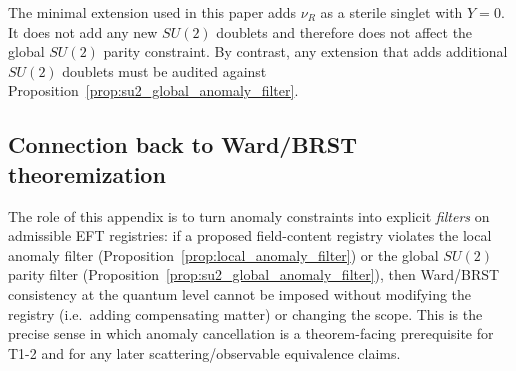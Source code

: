 \begin{remark}\label{rem:witten_filter_nur}
\AuditTag The minimal extension used in this paper adds $\nu_R$ as a sterile singlet with $Y=0$.
It does not add any new $SU(2)$ doublets and therefore does not affect the global $SU(2)$ parity constraint.
By contrast, any extension that adds additional $SU(2)$ doublets must be audited against Proposition~\ref{prop:su2_global_anomaly_filter}.
\end{remark}

\subsection{Connection back to Ward/BRST theoremization}

\AuditTag The role of this appendix is to turn anomaly constraints into explicit \emph{filters} on admissible EFT registries:
if a proposed field-content registry violates the local anomaly filter (Proposition~\ref{prop:local_anomaly_filter}) or the global $SU(2)$ parity filter (Proposition~\ref{prop:su2_global_anomaly_filter}), then Ward/BRST consistency at the quantum level cannot be imposed without modifying the registry (i.e.\ adding compensating matter) or changing the scope.
This is the precise sense in which anomaly cancellation is a theorem-facing prerequisite for T1-2 and for any later scattering/observable equivalence claims.

